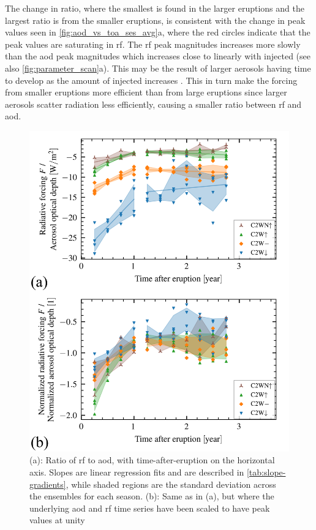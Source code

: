 \documentclass[twocol]{ametsocV6.1}
\begin{document}
The change in ratio, where the smallest is found in the larger eruptions and the largest
ratio is from the smaller eruptions, is consistent with the change in peak values seen
in \ref{fig:aod_vs_toa_ses_avg}a, where the red circles indicate that the peak values are
saturating in \gls{rf}. The \gls{rf} peak magnitudes increases more slowly than the
\gls{aod} peak magnitudes which increases close to linearly with injected  (see
also \ref{fig:parameter_scan}a). This may be the result of larger aerosols having time to
develop as the amount of injected  increases \citep{niemeier2015,marshall2019}.
This in turn make the forcing from smaller eruptions more efficient than from large
eruptions since larger aerosols scatter radiation less efficiently, causing a smaller
ratio between \gls{rf} and \gls{aod}.

\begin{figure}
  \centering
  \includegraphics[width=0.95\linewidth]{figures/aod_vs_toa_loop.png}

  \caption{(a): Ratio of \gls{rf} to \gls{aod}, with
    time-after-eruption on the horizontal axis. Slopes are linear regression fits and are
    described in \ref{tab:slope-gradients}, while shaded regions are the standard deviation
    across the ensembles for each season. (b): Same
    as in (a), but where the underlying \gls{aod} and
    \gls{rf} time series have been scaled to have peak values at
    unity}\label{fig:aod_vs_toa_avg_loop_ratios}%
\end{figure}
\end{document}
